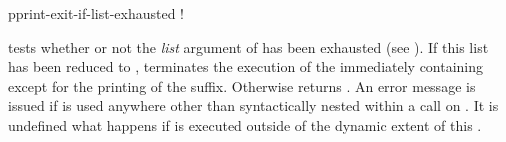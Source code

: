 \begin{defmac}
pprint-exit-if-list-exhausted \!!

 tests whether or not the \emph{list}
argument of  has been exhausted (see
).  If this list has been reduced to ,
 terminates the execution of the
immediately containing  except for the printing of
the suffix.  Otherwise  returns .
An error message is issued if  is used
anywhere other than syntactically nested within a call on
.  It is undefined what happens if 
is executed outside of the dynamic extent of this
.
\end{defmac}

